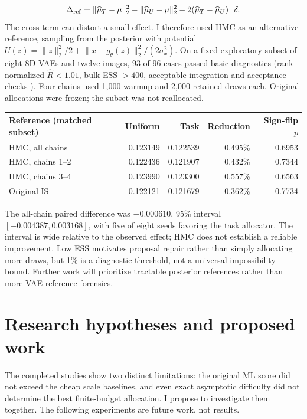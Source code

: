 \documentclass[11pt,letterpaper]{article}
\newcommand{\norm}[1]{\lVert #1\rVert_2}
\begin{document}
\begin{equation}
 \Delta_{\rm ref}=\norm{\widehat\mu_T-\mu}^2-\norm{\widehat\mu_U-\mu}^2-2(\widehat\mu_T-\widehat\mu_U)^\top\delta.
\end{equation}
The cross term can distort a small effect. I therefore used HMC \cite{neal2011} as an alternative reference, sampling from the posterior with potential $U(z)=\norm z^2/2+\norm{x-g_\theta(z)}^2/(2\sigma_x^2)$. On a fixed exploratory subset of eight 8D VAEs and twelve images, 93 of 96 cases passed basic diagnostics (rank-normalized $\widehat R<1.01$, bulk ESS $>400$, acceptable integration and acceptance checks \cite{vehtari2021}). Four chains used 1,000 warmup and 2,000 retained draws each. Original allocations were frozen; the subset was not reallocated.
\begin{center}\small
\begin{tabular}{@{}lrrrr@{}}
\toprule
Reference (matched subset)&Uniform&Task&Reduction&Sign-flip $p$\\
\midrule
HMC, all chains&0.123149&0.122539&0.495\%&0.6953\\
HMC, chains 1--2&0.122436&0.121907&0.432\%&0.7344\\
HMC, chains 3--4&0.123990&0.123300&0.557\%&0.6563\\
Original IS&0.122121&0.121679&0.362\%&0.7734\\
\bottomrule
\end{tabular}
\end{center}
The all-chain paired difference was $-0.000610$, 95\% interval $[-0.004387,0.003168]$, with five of eight seeds favoring the task allocator. The interval is wide relative to the observed effect; HMC does not establish a reliable improvement. Low ESS motivates proposal repair rather than simply allocating more draws, but 1\% is a diagnostic threshold, not a universal impossibility bound. Further work will prioritize tractable posterior references rather than more VAE reference forensics.
\clearpage
\section{Research hypotheses and proposed work}\label{sec:future}
The completed studies show two distinct limitations: the original ML score did not exceed the cheap scale baselines, and even exact asymptotic difficulty did not determine the best finite-budget allocation. I propose to investigate them together. The following experiments are future work, not results.
\end{document}
